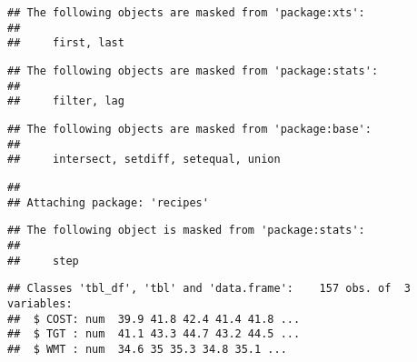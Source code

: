 \documentclass[]{article}
\newenvironment{Shaded}{\begin{snugshade}}{\end{snugshade}}
\newcommand{\CommentTok}[1]{\textcolor[rgb]{0.56,0.35,0.01}{\textit{#1}}}
\newcommand{\DataTypeTok}[1]{\textcolor[rgb]{0.13,0.29,0.53}{#1}}
\newcommand{\DecValTok}[1]{\textcolor[rgb]{0.00,0.00,0.81}{#1}}
\newcommand{\KeywordTok}[1]{\textcolor[rgb]{0.13,0.29,0.53}{\textbf{#1}}}
\newcommand{\NormalTok}[1]{#1}
\newcommand{\OperatorTok}[1]{\textcolor[rgb]{0.81,0.36,0.00}{\textbf{#1}}}
\newcommand{\StringTok}[1]{\textcolor[rgb]{0.31,0.60,0.02}{#1}}
\begin{document}
\begin{verbatim}
## The following objects are masked from 'package:xts':
## 
##     first, last
\end{verbatim}

\begin{verbatim}
## The following objects are masked from 'package:stats':
## 
##     filter, lag
\end{verbatim}

\begin{verbatim}
## The following objects are masked from 'package:base':
## 
##     intersect, setdiff, setequal, union
\end{verbatim}

\begin{verbatim}
## 
## Attaching package: 'recipes'
\end{verbatim}

\begin{verbatim}
## The following object is masked from 'package:stats':
## 
##     step
\end{verbatim}

\begin{Shaded}
\end{Shaded}

\begin{verbatim}
## Classes 'tbl_df', 'tbl' and 'data.frame':    157 obs. of  3 variables:
##  $ COST: num  39.9 41.8 42.4 41.4 41.8 ...
##  $ TGT : num  41.1 43.3 44.7 43.2 44.5 ...
##  $ WMT : num  34.6 35 35.3 34.8 35.1 ...
\end{verbatim}
\end{document}
